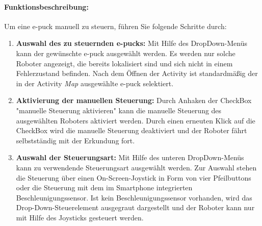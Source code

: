 \documentclass[10pt,a4paper]{article}
\begin{document}
 		\paragraph*{Funktionsbeschreibung:}
 		Um eine e-puck manuell zu steuern, führen Sie folgende Schritte durch:
 		\begin{enumerate}
 			\item \textbf{Auswahl des zu steuernden e-pucks:} Mit Hilfe des DropDown-Menüs kann der gewünschte e-puck ausgewählt werden. Es werden
 			nur solche Roboter angezeigt, die bereits lokalisiert sind und sich nicht in einem Fehlerzustand befinden. Nach dem Öffnen der Activity
 			ist standardmäßig der in der Activity \textit{Map} ausgewählte e-puck selektiert. 
 			\item \textbf{Aktivierung der manuellen Steuerung:} Durch Anhaken der CheckBox "manuelle Steuerung aktivieren" kann die manuelle 
 			Steuerung des ausgewählten Roboters aktiviert werden. Durch einen erneuten Klick auf die CheckBox wird die manuelle Steuerung deaktiviert
 			und der Roboter fährt selbstständig mit der Erkundung fort.
 			\item \textbf{Auswahl der Steuerungsart:} Mit Hilfe des unteren DropDown-Menüs kann zu verwendende Steuerungsart ausgewählt werden. Zur
 			Auswahl stehen die Steuerung über einen On-Screen-Joystick in Form von vier Pfeilbuttons oder die Steuerung mit dem im Smartphone
 			integrierten Beschleunigungssensor. Ist kein Beschleunigungssensor vorhanden, wird das Drop-Down-Steuerelement ausgegraut dargestellt und
 			der Roboter kann nur mit Hilfe des Joysticks gesteuert werden.
 			

\end{enumerate}
\end{document}
